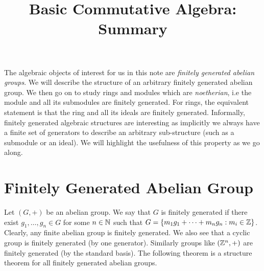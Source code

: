 \documentclass[11pt]{article}
\title{Basic Commutative Algebra: Summary}
\begin{document}
\maketitle

The algebraic objects of interest for us in this note are {\em finitely generated abelian groups}. We will
describe the structure of an arbitrary finitely generated abelian group. We then go on to study rings and modules
which are {\em noetherian}, i.e the module and all its submodules are finitely generated. For rings, the equivalent
statement is that the ring and all its ideals are finitely generated.
Informally, finitely generated algebraic structures are interesting as implicitly we always have a finite set of
generators to describe an arbitrary sub-structure (such as a submodule or an ideal). We will highlight the usefulness
of this property as we go along.

\section{Finitely Generated Abelian Group}\label{sec:fin-gen-abe-grp}
Let $(G,+)$ be an abelian group. We say that $G$ is finitely generated if there exist $g_1,\ldots,g_n\in G$ for
some $n\in \mathbb{N}$ such that $G=\{m_1 g_1+\cdots+m_n g_n: m_i\in \mathbb{Z}\}$. Clearly, any finite abelian group is finitely
generated. We also see that a cyclic group is finitely generated (by one generator). Similarly groups like
$(\mathbb{Z}^n,+)$ are finitely generated (by the standard basis). The following theorem is a structure theorem for all
finitely generated abelian groups.
\end{document}
